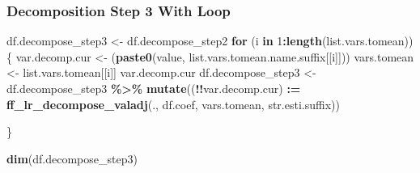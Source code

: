 \documentclass[
]{book}
\newenvironment{Shaded}{\begin{snugshade}}{\end{snugshade}}
\newcommand{\ControlFlowTok}[1]{\textcolor[rgb]{0.13,0.29,0.53}{\textbf{#1}}}
\newcommand{\DecValTok}[1]{\textcolor[rgb]{0.00,0.00,0.81}{#1}}
\newcommand{\ErrorTok}[1]{\textcolor[rgb]{0.64,0.00,0.00}{\textbf{#1}}}
\newcommand{\KeywordTok}[1]{\textcolor[rgb]{0.13,0.29,0.53}{\textbf{#1}}}
\newcommand{\NormalTok}[1]{#1}
\newcommand{\OperatorTok}[1]{\textcolor[rgb]{0.81,0.36,0.00}{\textbf{#1}}}
\newcommand{\StringTok}[1]{\textcolor[rgb]{0.31,0.60,0.02}{#1}}
\begin{document}
\begin{Shaded}
\end{Shaded}

\hypertarget{decomposition-step-3-with-loop}{%
\subsubsection{Decomposition Step 3 With Loop}\label{decomposition-step-3-with-loop}}

\begin{Shaded}
\begin{Highlighting}[]
\NormalTok{df.decompose\_step3 \textless{}{-}}\StringTok{ }\NormalTok{df.decompose\_step2}
\ControlFlowTok{for}\NormalTok{ (i }\ControlFlowTok{in} \DecValTok{1}\OperatorTok{:}\KeywordTok{length}\NormalTok{(list.vars.tomean)) \{}
\NormalTok{    var.decomp.cur \textless{}{-}}\StringTok{ }\NormalTok{(}\KeywordTok{paste0}\NormalTok{(}\StringTok{\textquotesingle{}value\textquotesingle{}}\NormalTok{, list.vars.tomean.name.suffix[[i]]))}
\NormalTok{    vars.tomean \textless{}{-}}\StringTok{ }\NormalTok{list.vars.tomean[[i]]}
\NormalTok{    var.decomp.cur}
\NormalTok{    df.decompose\_step3 \textless{}{-}}\StringTok{ }\NormalTok{df.decompose\_step3 }\OperatorTok{\%\textgreater{}\%}
\StringTok{      }\KeywordTok{mutate}\NormalTok{((}\OperatorTok{!!}\NormalTok{var.decomp.cur) }\OperatorTok{:}\ErrorTok{=}
\StringTok{               }\KeywordTok{ff\_lr\_decompose\_valadj}\NormalTok{(., df.coef, vars.tomean, str.esti.suffix))}

\NormalTok{\}}

\KeywordTok{dim}\NormalTok{(df.decompose\_step3)}
\end{Highlighting}
\end{Shaded}
\end{document}
